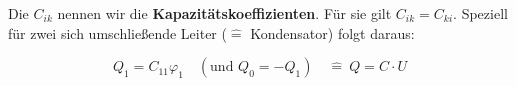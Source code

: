 Die $C_{ik}$ nennen wir die \textbf{Kapazitätskoeffizienten}. Für sie gilt $C_{ik} = C_{ki}$. Speziell für zwei sich umschließende Leiter ($\hat{=}$ Kondensator) folgt daraus:

\begin{equation*}
Q_1 = C_{11}\varphi_1 \quad (\text{und } Q_0 = -Q_1) \quad \hat{=} \ Q=C \cdot U
\end{equation*}